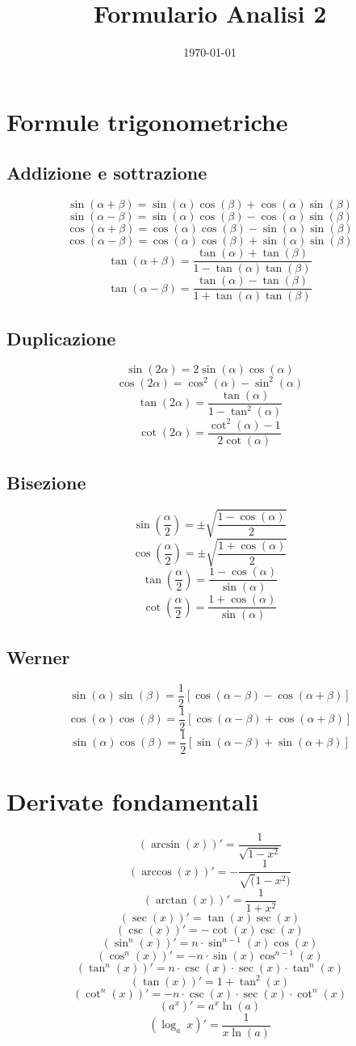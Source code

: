 \documentclass[a4paper,portrait,columns=3,5pt]{cheatsheet}
\title{Formulario Analisi 2}
\author{}
\date{\today}
\begin{document}

\section{Formule trigonometriche}
\subsection{Addizione e sottrazione}
$$\sin (\alpha + \beta) = \sin(\alpha) \cos(\beta) + \cos(\alpha)\sin(\beta)$$
$$\sin(\alpha - \beta) = \sin(\alpha) \cos(\beta) - \cos(\alpha)\sin(\beta)$$
$$\cos(\alpha + \beta) = \cos(\alpha) \cos(\beta) - \sin(\alpha) \sin(\beta)$$
$$\cos(\alpha - \beta) = \cos(\alpha) \cos(\beta) + \sin(\alpha) \sin(\beta)$$
$$\tan(\alpha + \beta) = \frac{\tan(\alpha) + \tan(\beta)}{1 - \tan(\alpha)\tan(\beta)}$$
$$\tan(\alpha - \beta) = \frac{\tan(\alpha) - \tan(\beta)}{1 + \tan(\alpha)\tan(\beta)}$$
\subsection{Duplicazione}
$$\sin(2\alpha) = 2\sin(\alpha)\cos(\alpha)$$
$$\cos(2\alpha) = \cos^2 (\alpha) - \sin^2 (\alpha)$$
$$\tan(2\alpha) = \frac{\tan(\alpha)}{1 - \tan^2(\alpha)}$$
$$\cot(2\alpha) = \frac{\cot^2(\alpha) - 1}{2\cot(\alpha)}$$
\subsection{Bisezione}
$$\sin\left(\frac{\alpha}{2}\right) = \pm \sqrt{\frac{1 - \cos(\alpha)}{2}}$$
$$\cos\left(\frac{\alpha}{2}\right) = \pm \sqrt{\frac{1 + \cos(\alpha)}{2}}$$
$$\tan\left(\frac{\alpha}{2}\right) = {\frac{1 - \cos(\alpha)}{\sin(\alpha)}}$$
$$\cot\left(\frac{\alpha}{2}\right) = {\frac{1 + \cos(\alpha)}{\sin(\alpha)}}$$
\subsection{Werner}
$$\sin(\alpha)\sin(\beta) = \frac{1}{2} \left[\cos(\alpha - \beta) - \cos(\alpha + \beta)\right]$$
$$\cos(\alpha)\cos(\beta) = \frac{1}{2} \left[\cos(\alpha - \beta) + \cos(\alpha + \beta)\right]$$
$$\sin(\alpha)\cos(\beta) = \frac{1}{2} \left[\sin(\alpha - \beta) + \sin(\alpha + \beta)\right]$$

\section{Derivate fondamentali}
$$ (\arcsin(x))' = \frac{1}{\sqrt{1 - x^2}}$$
$$ (\arccos(x))' = - \frac{1}{\sqrt(1 - x^2)}$$
$$ (\arctan(x))' = \frac{1}{1 + x^2}$$
$$ (\sec(x))' = \tan(x)\sec(x)$$
$$ (\csc(x))' = -\cot(x)\csc(x)$$
$$ (\sin^n(x))' = n\cdot \sin^{n-1}(x)\cos(x)$$
$$ (\cos^n(x))' = -n\cdot \sin(x)\cos^{n-1}(x)$$
$$ (\tan^n(x))' = n \cdot \csc(x) \cdot \sec(x) \cdot \tan^n (x)$$
$$ (\tan(x))' = 1 + \tan^2(x) $$
$$ (\cot^n(x))' = - n \cdot \csc(x) \cdot \sec(x) \cdot \cot^n (x)$$
$$ (a^x)' = a^x \ln(a)$$
$$ (\log_a~x )' = \frac{1}{x\ln(a)}$$
\end{document}

